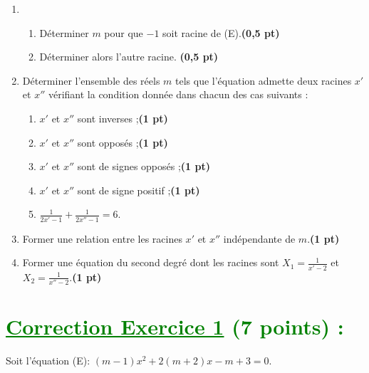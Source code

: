\documentclass[12pt]{article}
\begin{document}
\begin{enumerate}
    \item 
    \begin{enumerate}
        \item Déterminer \(m\) pour que \(-1\) soit racine de (E).\textbf{(0,5 pt)}
        
        \item Déterminer alors l’autre racine. \textbf{(0,5 pt)}
    \end{enumerate}

    \item Déterminer l’ensemble des réels \(m\) tels que l’équation admette deux racines \(x'\) et \(x''\) vérifiant la condition donnée dans chacun des cas suivants :
    \begin{enumerate}
        \item \(x'\) et \(x''\) sont inverses ;\textbf{(1 pt)}
        
        \item \(x'\) et \(x''\) sont opposés ;\textbf{(1 pt)}
        
        \item \(x'\) et \(x''\) sont de signes opposés ;\textbf{(1 pt)}
        
        \item \(x'\) et \(x''\) sont de signe positif ;\textbf{(1 pt)}
        
        \item \(\frac{1}{2x'-1} + \frac{1}{2x''-1} = 6\).
    \end{enumerate}

    \item Former une relation entre les racines \(x'\) et \(x''\) indépendante de \(m\).\textbf{(1 pt)}

    \item Former une équation du second degré dont les racines sont \(X_1 = \frac{1}{x' - 2}\) et \(X_2 = \frac{1}{x'' - 2}\).\textbf{(1 pt)}
\end{enumerate}
\section*{\textcolor{green}{\underline{Correction Exercice 1} (7 points) :}}
Soit l’équation (E): $(m -1)x^2 + 2(m + 2)x - m + 3 = 0$.
\end{document}
